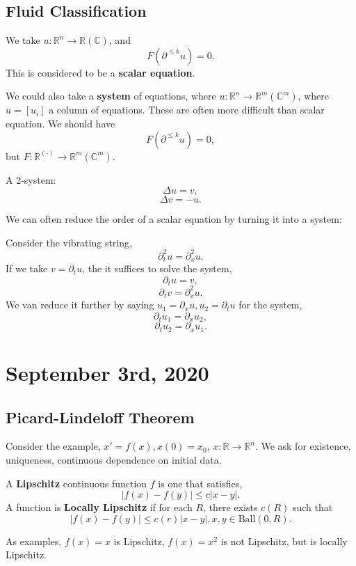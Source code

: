 \documentclass[11pt]{scrartcl}
\newcommand{\R}{\mathbb{R}}
\newcommand{\C}{\mathbb C}
\begin{document}
\subsection{Fluid Classification}
We take $u : \R^n \rightarrow \R(\C)$, and 
$$F(\partial^{\le k} u) =  0.$$
This is considered to be a \textbf{scalar equation}.

We could also take a \textbf{system} of equations, where $u: \R^n \rightarrow \R^m(\C^m)$, where $u = [u_i]$ a column of equations.  These are often more difficult than scalar equation.  We should have 
$$F(\partial^{\le k} u) = 0,$$
but $F : \R^{(\cdot)} \rightarrow \R^m(\C^m).$
\begin{example} A 2-system:
$$\Delta u = v,$$
$$\Delta v = -u.$$
\end{example}
We can often reduce the order of a scalar equation by turning it into a system:
\begin{example} Consider the vibrating string, $$\partial_t^2 u = \partial_x^2 u.$$
If we take $v = \partial_t u$, the it suffices to solve the system,
$$\partial_t u = v,$$
$$\partial_t v = \partial_x^2 u.$$
We van reduce it further by saying $u_1 = \partial_x u, u_2 = \partial_t u$ for the system,
$$\partial_t u_1 = \partial_x u_2,$$
$$\partial_t u_2 = \partial_x u_1.$$
\end{example}
\newpage
\section{September 3rd, 2020}
\subsection{Picard-Lindeloff Theorem}
Consider the example, $x' = f(x), x(0) = x_0$, $x: \R \rightarrow \R^n$.  We ask for existence, uniqueness,  continuous dependence on initial data.
\begin{definition}
A \textbf{Lipschitz} continuous function $f$ is one that satisfies, $$|f(x) - f(y)| \le c|x-y|.$$  A function is \textbf{Locally Lipschitz} if for each $R$, there exists $c(R)$ such that 
$$|f(x) - f(y)| \le c(r)|x - y|, x, y \in \text{Ball}(0, R).$$

As examples, $f(x) = x$ is Lipschitz, $f(x) = x^2$ is not Lipschitz, but is locally Lipschitz.
\end{definition}
\end{document}
